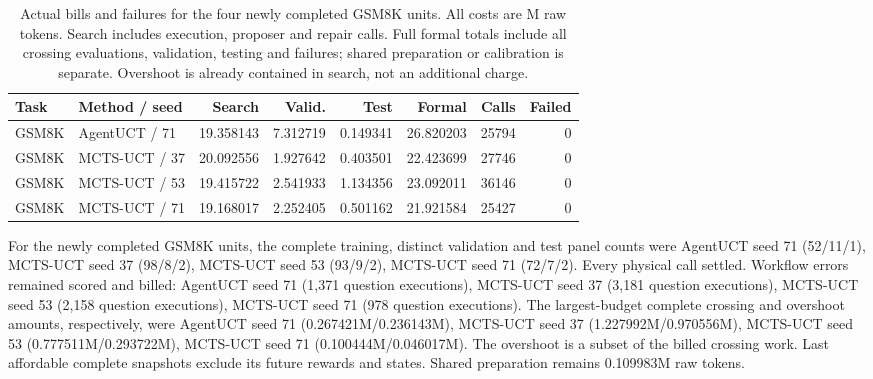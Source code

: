 \begin{table}[t]
\centering\footnotesize
\setlength{\tabcolsep}{3pt}
\caption{Actual bills and failures for the four newly completed GSM8K units. All costs are M raw tokens. Search includes execution, proposer and repair calls. Full formal totals include all crossing evaluations, validation, testing and failures; shared preparation or calibration is separate. Overshoot is already contained in search, not an additional charge.}
\label{tab:core-new-unit-bills}
\begin{tabular}{@{}llrrrrrr@{}}
\toprule
Task & Method / seed & Search & Valid. & Test & Formal & Calls & Failed\\
\midrule
GSM8K & AgentUCT / 71 & 19.358143 & 7.312719 & 0.149341 & 26.820203 & 25794 & 0\\
GSM8K & MCTS-UCT / 37 & 20.092556 & 1.927642 & 0.403501 & 22.423699 & 27746 & 0\\
GSM8K & MCTS-UCT / 53 & 19.415722 & 2.541933 & 1.134356 & 23.092011 & 36146 & 0\\
GSM8K & MCTS-UCT / 71 & 19.168017 & 2.252405 & 0.501162 & 21.921584 & 25427 & 0\\
\bottomrule
\end{tabular}
\end{table}

For the newly completed GSM8K units, the complete training, distinct validation
and test panel counts were AgentUCT seed 71 (52/11/1), MCTS-UCT seed 37 (98/8/2), MCTS-UCT seed 53 (93/9/2), MCTS-UCT seed 71 (72/7/2).
Every physical call settled. Workflow errors remained scored and billed:
AgentUCT seed 71 (1,371 question executions), MCTS-UCT seed 37 (3,181 question executions), MCTS-UCT seed 53 (2,158 question executions), MCTS-UCT seed 71 (978 question executions).
The largest-budget complete crossing and overshoot amounts, respectively,
were AgentUCT seed 71 (0.267421M/0.236143M), MCTS-UCT seed 37 (1.227992M/0.970556M), MCTS-UCT seed 53 (0.777511M/0.293722M), MCTS-UCT seed 71 (0.100444M/0.046017M).
The overshoot is a subset of the billed crossing work. Last affordable
complete snapshots exclude its future rewards and states. Shared preparation
remains 0.109983M raw tokens.

\ifdefined\AgentUCTReading\else\clearpage\fi
